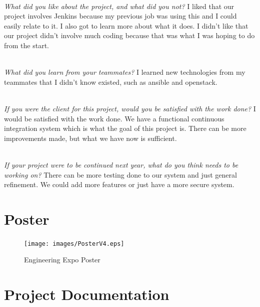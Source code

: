 \documentclass[10pt,letterpaper,onecolumn,draftclsnofoot]{IEEEtran}
\begin{document}
\textit{\\What did you like about the project, and what did you not?}
I liked that our project involves Jenkins because my previous job was using this and I could easily relate to it. I also got to learn more about what it does. I didn't like that our project didn't involve much coding because that was what I was hoping to do from the start.

\textit{\\What did you learn from your teammates?}
I learned new technologies from my teammates that I didn't know existed, such as ansible and openstack.

\textit{\\If you were the client for this project, would you be satisfied with the work done?}
I would be satisfied with the work done. We have a functional continuous integration system which is what the goal of this project is. There can be more improvements made, but what we have now is sufficient.

\textit{\\If your project were to be continued next year, what do you think needs to be working on?}
There can be more testing done to our system and just general refinement. We could add more features or just have a more secure system.\\
\clearpage
\section{Poster}
\begin{figure}[H]
  \texttt{[image: images/PosterV4.eps]}
  \caption{Engineering Expo Poster}
\end{figure}
\clearpage
\section{Project Documentation}
\end{document}

